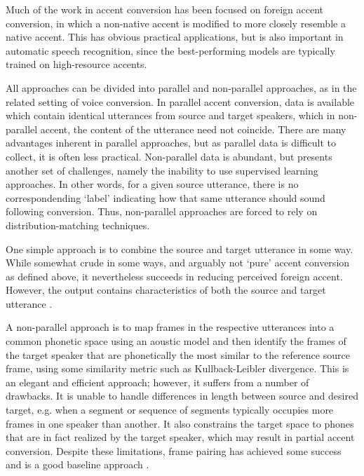 Much of the work in accent conversion has been focused on foreign accent conversion,
in which a non-native accent is modified to more closely resemble a native accent.
This has obvious practical applications, but is also important in automatic speech recognition,
since the best-performing models are typically trained on high-resource accents.

All approaches can be divided into parallel and non-parallel approaches, 
as in the related setting of voice conversion.
In parallel accent conversion, data is available which contain identical utterances from
source and target speakers, which in non-parallel accent, the content of the utterance 
need not coincide. There are many advantages inherent in parallel approaches, but 
as parallel data is difficult to collect, it is often less practical. Non-parallel 
data is abundant, but presents another set of challenges, namely the inability to 
use supervised learning approaches. In other words, for a given source utterance, 
there is no correspondending `label' indicating how that same utterance should sound
following conversion. Thus, non-parallel approaches are forced to rely on 
distribution-matching techniques.

One simple approach is to combine the source and target utterance in some way. 
While somewhat crude in some ways, and arguably not `pure' accent conversion as 
defined above, it nevertheless succeeds in reducing perceived foreign accent. 
However, the output contains characteristics of both the source and target utterance
\citep{voicemorph}.


A non-parallel approach is to map frames in the respective utterances into a common phonetic 
space using an aoustic model and then identify the frames of the target speaker that 
are phonetically the most similar to the reference source frame, 
using some similarity metric such as Kullback-Leibler divergence. 
This is an elegant and efficient approach; however, it suffers from a number of drawbacks.
It is unable to handle differences in length between source and desired target, e.g. when 
a segment or sequence of segments typically occupies more frames in one speaker than another.
It also constrains the target space to phones that are in fact realized by the target speaker, 
which may result in partial accent conversion.
Despite these limitations, frame pairing has achieved some success and is a good baseline 
approach
\citep{framepairing,acppgzhao}.

